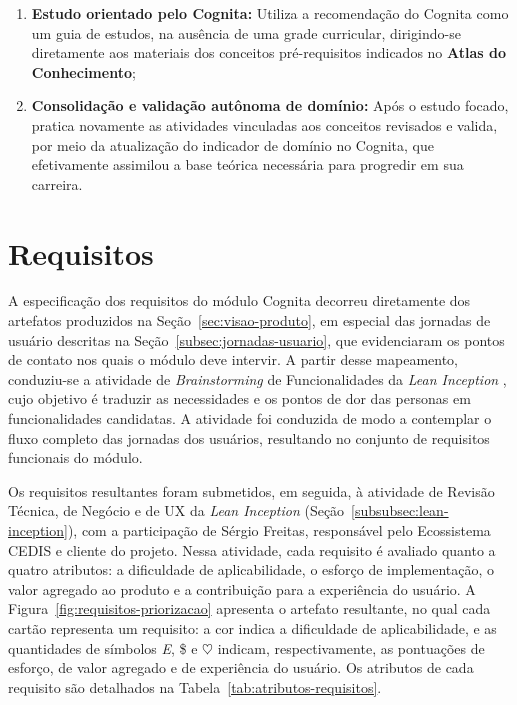 \begin{enumerate}
    \item \textbf{Estudo orientado pelo Cognita:} Utiliza a recomendação do Cognita como um guia de estudos, na ausência de uma grade curricular, dirigindo-se diretamente aos materiais dos conceitos pré-requisitos indicados no \textbf{Atlas do Conhecimento};
    \item \textbf{Consolidação e validação autônoma de domínio:} Após o estudo focado, pratica novamente as atividades vinculadas aos conceitos revisados e valida, por meio da atualização do indicador de domínio no Cognita, que efetivamente assimilou a base teórica necessária para progredir em sua carreira.
\end{enumerate}

\section{Requisitos}
\label{sec:requisitos}

A especificação dos requisitos do módulo Cognita decorreu diretamente dos artefatos produzidos na Seção~\ref{sec:visao-produto}, em especial das jornadas de usuário descritas na Seção~\ref{subsec:jornadas-usuario}, que evidenciaram os pontos de contato nos quais o módulo deve intervir. A partir desse mapeamento, conduziu-se a atividade de \textit{Brainstorming} de Funcionalidades da \textit{Lean Inception} \cite{caroli_lean_2018}, cujo objetivo é traduzir as necessidades e os pontos de dor das personas em funcionalidades candidatas. A atividade foi conduzida de modo a contemplar o fluxo completo das jornadas dos usuários, resultando no conjunto de requisitos funcionais do módulo.

Os requisitos resultantes foram submetidos, em seguida, à atividade de Revisão Técnica, de Negócio e de UX da \textit{Lean Inception} (Seção~\ref{subsubsec:lean-inception}), com a participação de Sérgio Freitas, responsável pelo Ecossistema CEDIS e cliente do projeto. Nessa atividade, cada requisito é avaliado quanto a quatro atributos: a dificuldade de aplicabilidade, o esforço de implementação, o valor agregado ao produto e a contribuição para a experiência do usuário. A Figura~\ref{fig:requisitos-priorizacao} apresenta o artefato resultante, no qual cada cartão representa um requisito: a cor indica a dificuldade de aplicabilidade, e as quantidades de símbolos \textit{E}, \$ e $\heartsuit$ indicam, respectivamente, as pontuações de esforço, de valor agregado e de experiência do usuário. Os atributos de cada requisito são detalhados na Tabela~\ref{tab:atributos-requisitos}.

